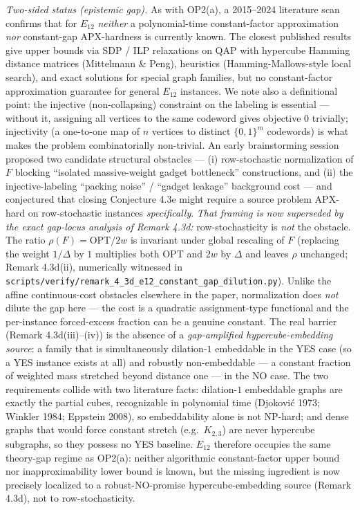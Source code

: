 \documentclass[
]{article}
\begin{document}
\begin{itemize}
  \emph{Two-sided status (epistemic gap).} As with OP2(a), a 2015--2024
  literature scan confirms that for $E_{12}$ \emph{neither} a
  polynomial-time constant-factor approximation \emph{nor} constant-gap
  APX-hardness is currently known. The closest published results give
  upper bounds via SDP / ILP relaxations on QAP with hypercube Hamming
  distance matrices (Mittelmann \& Peng), heuristics
  (Hamming-Mallows-style local search), and exact solutions for special
  graph families, but no constant-factor approximation guarantee for
  general $E_{12}$ instances. We note also a definitional point: the
  injective (non-collapsing) constraint on the labeling is essential
  --- without it, assigning all vertices to the same codeword gives
  objective $0$ trivially; injectivity (a one-to-one map of $n$
  vertices to distinct $\{0,1\}^m$ codewords) is what makes the
  problem combinatorially non-trivial. An early brainstorming session proposed two candidate structural obstacles ---
  (i) row-stochastic normalization of $F$ blocking ``isolated
  massive-weight gadget bottleneck'' constructions, and (ii) the
  injective-labeling ``packing noise'' / ``gadget leakage'' background
  cost --- and conjectured that closing Conjecture 4.3e might require a
  source problem APX-hard on row-stochastic instances \emph{specifically}.
  \emph{That framing is now superseded by the exact gap-locus analysis of
  Remark 4.3d:} row-stochasticity is \emph{not} the obstacle. The ratio
  $\rho(F)=\mathrm{OPT}/2w$ is invariant under global rescaling of $F$
  (replacing the weight $1/\Delta$ by $1$ multiplies both $\mathrm{OPT}$
  and $2w$ by $\Delta$ and leaves $\rho$ unchanged; Remark 4.3d(ii),
  numerically witnessed in
  \texttt{scripts/verify/remark\_4\_3d\_e12\_constant\_gap\_dilution.py}).
  Unlike the affine continuous-cost obstacles elsewhere in the paper,
  normalization does \emph{not} dilute the gap here --- the cost is a
  quadratic assignment-type functional and the per-instance forced-excess
  fraction can be a genuine constant. The real barrier (Remark 4.3d(iii)--(iv))
  is the absence of a \emph{gap-amplified hypercube-embedding source}: a
  family that is simultaneously dilation-$1$ embeddable in the YES case
  (so a YES instance exists at all) and robustly non-embeddable --- a
  constant fraction of weighted mass stretched beyond distance one --- in
  the NO case. The two requirements collide with two literature facts:
  dilation-$1$ embeddable graphs are exactly the partial cubes,
  recognizable in polynomial time (Djokovi\'c 1973; Winkler 1984;
  Eppstein 2008), so embeddability alone is not NP-hard; and dense graphs
  that would force constant stretch (e.g.\ $K_{2,3}$) are never
  hypercube subgraphs, so they possess no YES baseline. $E_{12}$ therefore
  occupies the same theory-gap regime as OP2(a): neither algorithmic
  constant-factor upper bound nor inapproximability lower bound is
  known, but the missing ingredient is now precisely localized to a
  robust-NO-promise hypercube-embedding source (Remark 4.3d), not to
  row-stochasticity.


\end{itemize}
\end{document}
